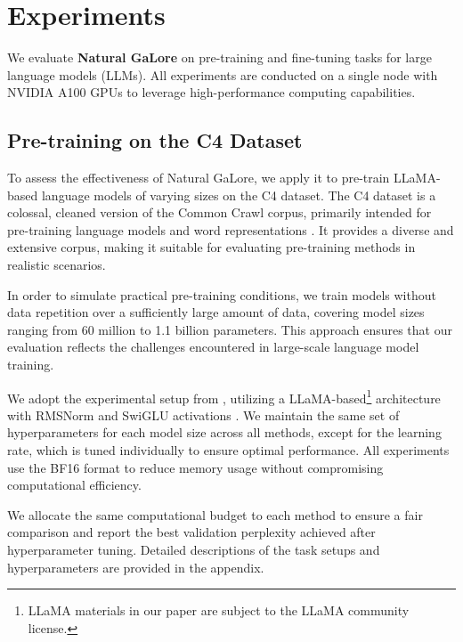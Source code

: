 \section{Experiments}

We evaluate \textbf{Natural GaLore} on pre-training and fine-tuning tasks for large language models (LLMs). All experiments are conducted on a single node with NVIDIA A100 GPUs to leverage high-performance computing capabilities.

\subsection{Pre-training on the C4 Dataset}

To assess the effectiveness of Natural GaLore, we apply it to pre-train LLaMA-based language models of varying sizes on the C4 dataset. The C4 dataset is a colossal, cleaned version of the Common Crawl corpus, primarily intended for pre-training language models and word representations \citep{raffelExploringLimitsTransfer2023}. It provides a diverse and extensive corpus, making it suitable for evaluating pre-training methods in realistic scenarios.

In order to simulate practical pre-training conditions, we train models without data repetition over a sufficiently large amount of data, covering model sizes ranging from 60 million to 1.1 billion parameters. This approach ensures that our evaluation reflects the challenges encountered in large-scale language model training.

We adopt the experimental setup from \citet{lialinReLoRAHighRankTraining2023}, utilizing a LLaMA-based\footnote[3]{LLaMA materials in our paper are subject to the LLaMA community license.} architecture with RMSNorm and SwiGLU activations \citep{zhangRootMeanSquare2019,shazeerGLUVariantsImprove2020,touvronLlamaOpenFoundation2023}. We maintain the same set of hyperparameters for each model size across all methods, except for the learning rate, which is tuned individually to ensure optimal performance. All experiments use the BF16 format to reduce memory usage without compromising computational efficiency.

We allocate the same computational budget to each method to ensure a fair comparison and report the best validation perplexity achieved after hyperparameter tuning. Detailed descriptions of the task setups and hyperparameters are provided in the appendix.



